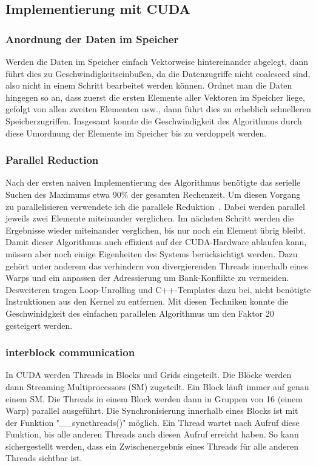 \documentclass{scrartcl}
\begin{document}
\subsection{Implementierung mit CUDA}
\subsubsection{Anordnung der Daten im Speicher}
Werden die Daten im Speicher einfach Vektorweise hintereinander abgelegt, 
dann führt dies zu Geschwindigkeitseinbußen, da die Datenzugriffe nicht coalesced sind, also nicht in einem Schritt 
bearbeitet werden können.
Ordnet man die Daten hingegen so an, dass zuerst die ersten Elemente aller Vektoren im Speicher liege, gefolgt von allen zweiten Elementen usw., dann führt
dies zu erheblich schnelleren Speicherzugriffen.
Insgesamt konnte die Geschwindigkeit des Algorithmus durch diese Umordnung der Elemente im Speicher bis zu verdoppelt werden.

\subsubsection{Parallel Reduction}
Nach der ersten naiven Implementierung des Algorithmus benötigte das serielle Suchen des Maximums etwa 90\% der gesamten Rechenzeit. %
Um diesen Vorgang zu parallelisieren verwendete ich die parallele Reduktion~\cite{parallelreduction}.
Dabei werden parallel jeweils zwei Elemente miteinander verglichen.
Im nächsten Schritt werden die Ergebnisse wieder miteinander verglichen, bis nur noch ein Element übrig bleibt.
Damit dieser Algorithmus auch effizient auf der CUDA-Hardware ablaufen kann, müssen aber noch einige Eigenheiten des Systems berücksichtigt werden.
Dazu gehört unter anderem das verhindern von divergierenden Threads innerhalb eines Warps und ein anpassen der Adressierung um Bank-Konflikte zu vermeiden.
Desweiteren tragen Loop-Unrolling und C++-Templates dazu bei, nicht benötigte Instruktionen aus den Kernel zu entfernen.
Mit diesen Techniken konnte die Geschwinidgkeit des einfachen parallelen Algorithmus um den Faktor 20 gesteigert werden.
\subsubsection{interblock communication}
In CUDA werden Threads in Blocks und Grids eingeteilt.
Die Blöcke werden dann Streaming Multiprocessors (SM) zugeteilt.
Ein Block läuft immer auf genau einem SM.
Die Threads in einem Block werden dann in Gruppen von 16 (einem Warp) parallel ausgeführt.
Die Synchronisierung innerhalb eines Blocks ist mit der Funktion "\_\_syncthreads()" möglich.
Ein Thread wartet nach Aufruf diese Funktion, bis alle anderen Threads auch diesen Aufruf erreicht haben.
So kann sichergestellt werden, dass ein Zwischenergebnis eines Threads für alle anderen Threads sichtbar ist.
\end{document}
